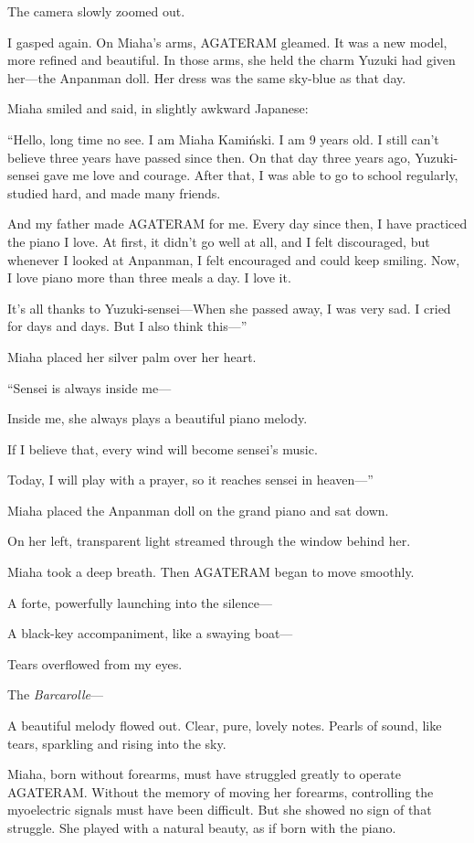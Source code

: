 \documentclass[
    a4paper,
    12pt,
    twoside,
    openany,
    UTF8,
    fontset=windows
]{ctexbook}
\begin{document}
The camera slowly zoomed out.

I gasped again. On Miaha's arms, AGATERAM gleamed. It was a new model, more refined and beautiful. In those arms, she held the charm Yuzuki had given her---the Anpanman doll. Her dress was the same sky-blue as that day.

Miaha smiled and said, in slightly awkward Japanese:

``Hello, long time no see. I am Miaha Kamiński. I am 9 years old. I still can't believe three years have passed since then. On that day three years ago, Yuzuki-sensei gave me love and courage. After that, I was able to go to school regularly, studied hard, and made many friends.

And my father made AGATERAM for me. Every day since then, I have practiced the piano I love. At first, it didn't go well at all, and I felt discouraged, but whenever I looked at Anpanman, I felt encouraged and could keep smiling. Now, I love piano more than three meals a day. I love it.

It's all thanks to Yuzuki-sensei---When she passed away, I was very sad. I cried for days and days. But I also think this---''

Miaha placed her silver palm over her heart.

``Sensei is always inside me---

Inside me, she always plays a beautiful piano melody.

If I believe that, every wind will become sensei's music.

Today, I will play with a prayer, so it reaches sensei in heaven---''

Miaha placed the Anpanman doll on the grand piano and sat down.

On her left, transparent light streamed through the window behind her.

Miaha took a deep breath. Then AGATERAM began to move smoothly.

A forte, powerfully launching into the silence---

A black-key accompaniment, like a swaying boat---

Tears overflowed from my eyes.

The \textit{Barcarolle}---

A beautiful melody flowed out. Clear, pure, lovely notes. Pearls of sound, like tears, sparkling and rising into the sky.

Miaha, born without forearms, must have struggled greatly to operate AGATERAM. Without the memory of moving her forearms, controlling the myoelectric signals must have been difficult. But she showed no sign of that struggle. She played with a natural beauty, as if born with the piano.
\end{document}
